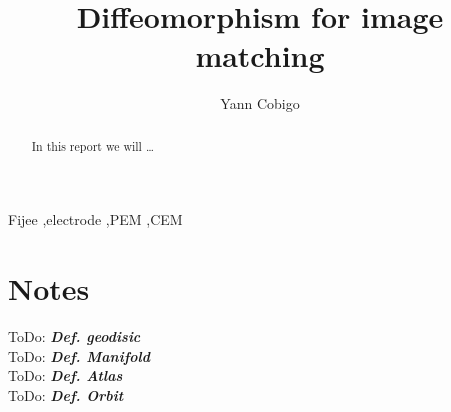 \documentclass[final, paper=letter,5p,times,twocolumn]{elsarticle}
\newcommand{\ToDo}[1]{ToDo: \textbf{\textit{#1}}}
\theoremstyle{definition}
\begin{document}
\begin{frontmatter}

\title{Diffeomorphism for image matching}

\author[label1]{Yann Cobigo}
\address[label1]{University of California, San Francisco | ucsf.edu}




\begin{abstract}
In this report we will \dots
\end{abstract}

\begin{keyword}
Fijee \sep electrode \sep PEM \sep CEM
\end{keyword}

\end{frontmatter}


\section{Notes}

\ToDo{Def. geodisic} \\
\ToDo{Def. Manifold} \\
\ToDo{Def. Atlas} \\
\ToDo{Def. Orbit} \\
\end{document}
